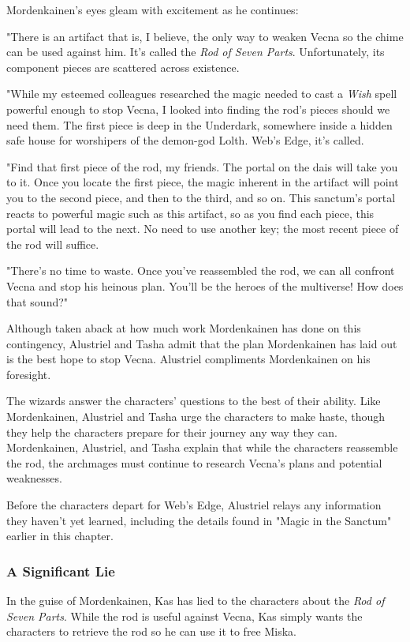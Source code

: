 \documentclass[10pt,a4paper,twoside,bg=print,twocolumn,openany,nodeprecatedcode]{dndbook}
\begin{document}
Mordenkainen's eyes gleam with excitement as he continues:

\begin{DndReadAloud}{}
"There is an artifact that is, I believe, the only way to weaken Vecna so the chime can be used against him. It's called the \textit{Rod of Seven Parts}. Unfortunately, its component pieces are scattered across existence.

"While my esteemed colleagues researched the magic needed to cast a \textit{Wish} spell powerful enough to stop Vecna, I looked into finding the rod's pieces should we need them. The first piece is deep in the Underdark, somewhere inside a hidden safe house for worshipers of the demon-god Lolth. Web's Edge, it's called.

"Find that first piece of the rod, my friends. The portal on the dais will take you to it. Once you locate the first piece, the magic inherent in the artifact will point you to the second piece, and then to the third, and so on. This sanctum's portal reacts to powerful magic such as this artifact, so as you find each piece, this portal will lead to the next. No need to use another key; the most recent piece of the rod will suffice.

"There's no time to waste. Once you've reassembled the rod, we can all confront Vecna and stop his heinous plan. You'll be the heroes of the multiverse! How does that sound?"

\end{DndReadAloud}

Although taken aback at how much work Mordenkainen has done on this contingency, Alustriel and Tasha admit that the plan Mordenkainen has laid out is the best hope to stop Vecna. Alustriel compliments Mordenkainen on his foresight.

The wizards answer the characters' questions to the best of their ability. Like Mordenkainen, Alustriel and Tasha urge the characters to make haste, though they help the characters prepare for their journey any way they can. Mordenkainen, Alustriel, and Tasha explain that while the characters reassemble the rod, the archmages must continue to research Vecna's plans and potential weaknesses.

Before the characters depart for Web's Edge, Alustriel relays any information they haven't yet learned, including the details found in "Magic in the Sanctum" earlier in this chapter.

\subsubsection{A Significant Lie}
In the guise of Mordenkainen, Kas has lied to the characters about the \textit{Rod of Seven Parts}. While the rod is useful against Vecna, Kas simply wants the characters to retrieve the rod so he can use it to free Miska.
\end{document}
